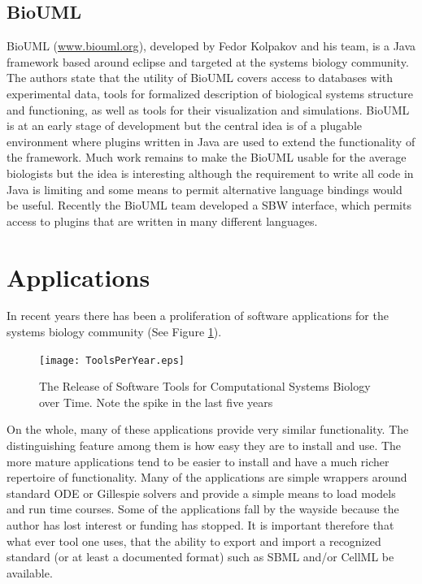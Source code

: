 \documentclass[12pt]{article}
\begin{document}
{\subsection{BioUML}

BioUML (\url{www.biouml.org}), developed by Fedor Kolpakov
and his team, is a Java framework based around eclipse and targeted
at the systems biology community. The authors state that the
utility of BioUML covers access to databases with experimental
data, tools for formalized description of biological systems
structure and functioning, as well as tools for their
visualization and simulations. BioUML is at an early stage of
development but the central idea is of a plugable environment
where plugins written in Java are used to extend the functionality
of the framework.  Much work remains to make the BioUML usable for
the average biologists but the idea is interesting although the
requirement to write all code in Java is limiting and some means
to permit alternative language bindings would be useful. Recently
the BioUML team developed a SBW interface, which permits
access to plugins that are written in many different languages.

\section{Applications}

In recent years there has been a proliferation of software applications for the systems biology community (See Figure \ref{Apps:Graph}).

\begin{figure}[h]
\begin{center}
  \texttt{[image: ToolsPerYear.eps]}
\end{center}
\caption{The Release of Software Tools for Computational Systems Biology over Time. Note the spike in the last five years}
\label{Apps:Graph}
\end{figure}

On the whole, many of these applications provide very similar functionality. The distinguishing feature among them is how easy they are to install and use. The more mature applications tend to be easier to install and have a much richer repertoire of functionality. Many of the applications are simple wrappers around standard ODE or Gillespie solvers and provide a simple means to load models and run time courses. Some of the applications fall by the wayside because the author has lost interest or funding has stopped. It is important therefore that what ever tool one uses, that the ability to export and import a recognized standard (or at least a documented format) such as SBML and/or CellML be available.

}
\end{document}
